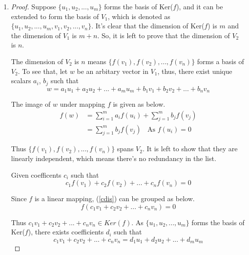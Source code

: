 \documentclass[paper=a4, fontsize=11pt]{scrartcl} %
\numberwithin{equation}{section} %
\numberwithin{figure}{section} %
\numberwithin{table}{section} %
\begin{document}
\begin{enumerate}
	\item
		\begin{proof}
			Suppose $\{u_1, u_2, ... , u_m \}$ forms the basis of Ker($f$), and it can be extended to form the basis of $V_1$, which is denoted as $\{u_1, u_2, ... , u_m, v_1, v_2, ... , v_n \}$. It's clear that the dimension of Ker($f$) is $m$ and the dimension of $V_1$ is $m+n$. So, it is left to prove that the dimension of $V_2$ is $n$.
			
			The dimension of $V_2$ is $n$ means $\{f(v_1), f(v_2), ... , f(v_n)\}$ forms a basis of $V_2$. To see that, let $w$ be an arbitary vector in $V_1$, thus, there exist unique scalars $a_i$, $b_j$ such that 
			\begin{equation}
				w = a_1 u_1 + a_2 u_2 + ... + a_m u_m + b_1 v_1 + b_2 v_2 + ... + b_n v_n
			\end{equation}
			
			The image of $w$ under mapping $f$ is given as below.
			\begin{equation}
				\begin{aligned}
					f(w) & = \sum_{i=1}^{m}a_i f(u_i) + \sum_{j=1}^{m}b_j f(v_j) \\
						 & = \sum_{j=1}^{m}b_j f(v_j)  \ \ \ \  \text{As $f(u_i) = 0$}
				\end{aligned}
			\end{equation}
			
			Thus $\{f(v_1), f(v_2), ... , f(v_n)\}$ spans $V_2$. It is left to show that they are linearly independent, which means there's no redundancy in the list.
			
			Given coefficents $c_i$ such that
			\begin{equation}
				c_1 f(v_1) + c_2 f(v_2) + ... + c_n f(v_n) = 0 \label{cdis}
			\end{equation}
			
			Since $f$ is a linear mapping, (\ref{cdis}) can be grouped as below.
			\begin{equation}
				f(c_1 v_1 + c_2 v_2 + ... + c_n v_n) = 0
			\end{equation}
			
			Thus $c_1 v_1 + c_2 v_2 + ... + c_n v_n \in Ker(f)$. As $\{u_1, u_2, ... , u_m \}$ forms the basis of Ker($f$), there exists coefficients $d_i$ such that
			\begin{equation}
				c_1 v_1 + c_2 v_2 + ... + c_n v_n = d_1 u_1 + d_2 u_2 + ... + d_m u_m \label{diff}
			\end{equation}
			

\end{proof}
\end{enumerate}
\end{document}
